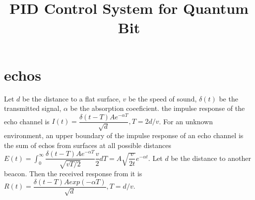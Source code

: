 \documentclass{article}
\begin{document}
\title{PID Control System for Quantum Bit}
\maketitle
\section{echos}
Let $d$ be the distance to a flat surface, $v$ be the speed of sound, $\delta(t)$ be the transmitted signal, $\alpha$ be the absorption coeeficient. the impulse response of the echo channel is $I(t)=\dfrac{\delta(t-T)Ae^{-\alpha T}}{\sqrt{d}}, T=2d/v$. For an unknown environment, an upper boundary of the impulse response of an echo channel is the sum of echos from surfaces at all possible distances $E(t)=\int^{\infty}_0 \dfrac{\delta(t-T)Ae^{-\alpha T}}{\sqrt{vT/2}}\dfrac{v}{2} dT=A\sqrt{\dfrac{v}{2t}}e^{-\alpha t}$.
Let $d$ be the distance to another beacon. Then the received response from it is $R(t)=\dfrac{\delta(t-T)Aexp(-\alpha T)}{\sqrt{d}}, T=d/v$.
\end{document}
